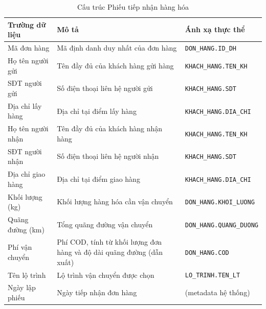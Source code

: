 \documentclass[11pt]{report}
\begin{document}
\begin{table}[H]
    \centering
    \renewcommand{\tabularxcolumn}[1]{m{#1}}
    \begin{tabularx}{\textwidth}{|l|X|l|} \hline
        \rowcolor{teal!30}
        \textbf{Trường dữ liệu} & \textbf{Mô tả} & \textbf{Ánh xạ thực thể} \\ \hline
        Mã đơn hàng       & Mã định danh duy nhất của đơn hàng                                    & \texttt{\footnotesize DON\_HANG.ID\_DH} \\ \hline
        Họ tên người gửi  & Tên đầy đủ của khách hàng gửi hàng                                    & \texttt{\footnotesize KHACH\_HANG.TEN\_KH} \\ \hline
        SĐT người gửi     & Số điện thoại liên hệ người gửi                                       & \texttt{\footnotesize KHACH\_HANG.SDT} \\ \hline
        Địa chỉ lấy hàng  & Địa chỉ tại điểm lấy hàng                                             & \texttt{\footnotesize KHACH\_HANG.DIA\_CHI} \\ \hline
        Họ tên người nhận & Tên đầy đủ của khách hàng nhận hàng                                   & \texttt{\footnotesize KHACH\_HANG.TEN\_KH} \\ \hline
        SĐT người nhận    & Số điện thoại liên hệ người nhận                                      & \texttt{\footnotesize KHACH\_HANG.SDT} \\ \hline
        Địa chỉ giao hàng & Địa chỉ tại điểm giao hàng                                            & \texttt{\footnotesize KHACH\_HANG.DIA\_CHI} \\ \hline
        Khối lượng (kg)   & Khối lượng hàng hóa cần vận chuyển                                    & \texttt{\footnotesize DON\_HANG.KHOI\_LUONG} \\ \hline
        Quãng đường (km)  & Tổng quãng đường vận chuyển                                           & \texttt{\footnotesize DON\_HANG.QUANG\_DUONG} \\ \hline
        Phí vận chuyển    & Phí COD, tính từ khối lượng đơn hàng và độ dài quãng đường (dẫn xuất) & \texttt{\footnotesize DON\_HANG.COD} \\ \hline
        Tên lộ trình      & Lộ trình vận chuyển được chọn                                         & \texttt{\footnotesize LO\_TRINH.TEN\_LT} \\ \hline
        Ngày lập phiếu    & Ngày tiếp nhận đơn hàng                                               & (metadata hệ thống) \\ \hline
    \end{tabularx}
    \caption{Cấu trúc Phiếu tiếp nhận hàng hóa}
    \label{tab:phieutiepnhan}
\end{table}
\end{document}
